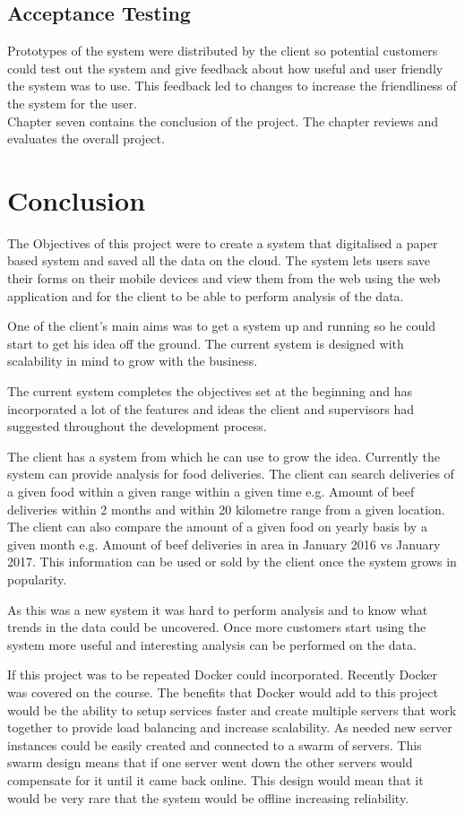 \section{Acceptance Testing}
Prototypes of the system were distributed by the client so potential customers could test out the system and give feedback about how useful and user friendly the system was to use. This feedback led to changes to increase the friendliness of the system for the user. \\

Chapter seven contains the conclusion of the project. The chapter reviews and evaluates the overall project.

\chapter{Conclusion}
The Objectives of this project were to create a system that digitalised a paper based system and saved all the data on the cloud. The system lets users save their forms on their mobile devices and view them from the web using the web application and for the client to be able to perform analysis of the data. 

One of the client’s main aims was to get a system up and running so he could start to get his idea off the ground. The current system is designed with scalability in mind to grow with the business.

The current system completes the objectives set at the beginning and has incorporated a lot of the features and ideas the client and supervisors had suggested throughout the development process. 

The client has a system from which he can use to grow the idea. Currently the system can provide analysis for food deliveries. The client can search deliveries of a given food within a given range within a given time e.g. Amount of beef deliveries within 2 months and within 20 kilometre range from a given location. The client can also compare the amount of a given food on yearly basis by a given month e.g. Amount of beef deliveries in area in January 2016 vs January 2017. This information can be used or sold by the client once the system grows in popularity. 

As this was a new system it was hard to perform analysis and to know what trends in the data could be uncovered. Once more customers start using the system more useful and interesting analysis can be performed on the data. 

If this project was to be repeated Docker could incorporated. Recently Docker was covered on the course. The benefits that Docker would add to this project would be the ability to setup services faster and create multiple servers that work together to provide load balancing and increase scalability. As needed new server instances could be easily created and connected to a swarm of servers. This swarm design means that if one server went down the other servers would compensate for it until it came back online. This design would mean that it would be very rare that the system would be offline increasing reliability.


